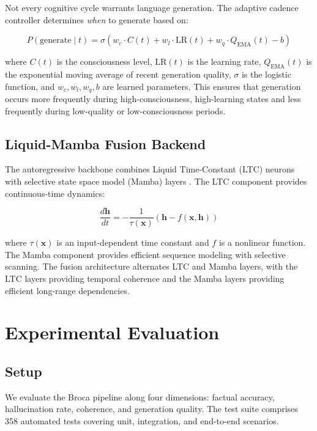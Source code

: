 \documentclass[12pt,a4paper]{article}
\begin{document}
Not every cognitive cycle warrants language generation. The adaptive cadence controller determines \emph{when} to generate based on:

\begin{equation}
P(\text{generate} \mid t) = \sigma\left( w_c \cdot C(t) + w_l \cdot \text{LR}(t) + w_q \cdot Q_{\text{EMA}}(t) - b \right)
\end{equation}

where $C(t)$ is the consciousness level, $\text{LR}(t)$ is the learning rate, $Q_{\text{EMA}}(t)$ is the exponential moving average of recent generation quality, $\sigma$ is the logistic function, and $w_c, w_l, w_q, b$ are learned parameters. This ensures that generation occurs more frequently during high-consciousness, high-learning states and less frequently during low-quality or low-consciousness periods.

\subsection{Liquid-Mamba Fusion Backend}

The autoregressive backbone combines Liquid Time-Constant (LTC) neurons \citep{hasani2021liquid} with selective state space model (Mamba) layers \citep{gu2024mamba}. The LTC component provides continuous-time dynamics:

\begin{equation}
\frac{d\mathbf{h}}{dt} = -\frac{1}{\tau(\mathbf{x})} \left(\mathbf{h} - f(\mathbf{x}, \mathbf{h})\right)
\end{equation}

where $\tau(\mathbf{x})$ is an input-dependent time constant and $f$ is a nonlinear function. The Mamba component provides efficient sequence modeling with selective scanning. The fusion architecture alternates LTC and Mamba layers, with the LTC layers providing temporal coherence and the Mamba layers providing efficient long-range dependencies.

\section{Experimental Evaluation}

\subsection{Setup}

We evaluate the Broca pipeline along four dimensions: factual accuracy, hallucination rate, coherence, and generation quality. The test suite comprises 358 automated tests covering unit, integration, and end-to-end scenarios.
\end{document}

